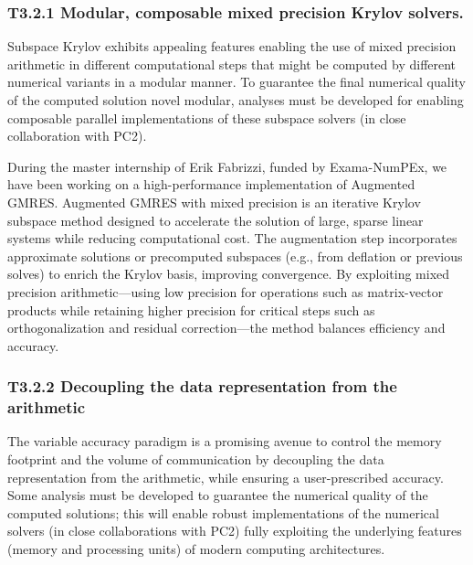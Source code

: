  \subsubsection{ 
 T3.2.1 Modular, composable mixed precision Krylov solvers. 
 }
  Subspace Krylov exhibits appealing
features enabling the use of mixed precision arithmetic in different computational steps that might be
computed by different numerical variants in a modular manner. To guarantee the final numerical
quality of the computed solution novel modular, analyses must be developed for enabling composable
parallel implementations of these subspace solvers (in close collaboration with PC2).


During the master internship of Erik Fabrizzi, funded by Exama-NumPEx, we have been working on a high-performance implementation of Augmented GMRES. Augmented GMRES with mixed precision is an iterative Krylov subspace method designed to accelerate the solution of large, sparse linear systems while reducing computational cost. The augmentation step incorporates approximate solutions or precomputed subspaces (e.g., from deflation or previous solves) to enrich the Krylov basis, improving convergence. By exploiting mixed precision arithmetic—using low precision for operations such as matrix-vector products while retaining higher precision for critical steps such as orthogonalization and residual correction—the method balances efficiency and accuracy. 

 \subsubsection{ T3.2.2 Decoupling the data representation from the arithmetic}

The variable accuracy paradigm is a promising avenue to control the memory footprint and the
volume of communication by decoupling the data representation from the arithmetic, while ensuring a
user-prescribed accuracy. Some analysis must be developed to guarantee the numerical quality of the
computed solutions; this will enable robust implementations of the numerical solvers (in close
collaborations with PC2) fully exploiting the underlying features (memory and processing units) of
modern computing architectures. 


